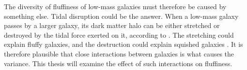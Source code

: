 The diversity of fluffiness of low-mass galaxies must therefore be caused by something else. Tidal disruption could be the answer. When a low-mass galaxy passes by a larger galaxy, its dark matter halo can be either stretched or destroyed by the tidal force exerted on it, according to \cite{morenoGalaxiesLackingDark2022}. The stretching could explain fluffy galaxies, and the destruction could explain squished galaxies \citep{applebaumUltrafaintDwarfsMilky2021}. It is therefore plausible that close interactions between galaxies is what causes the variance. This thesis will examine the effect of such interactions on fluffiness.